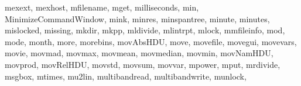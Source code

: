{{%
        mexext,%
        mexhost,%
        mfilename,%
        mget,%
        milliseconds,%
        min,%
        MinimizeCommandWindow,%
        mink,%
        minres,%
        minspantree,%
        minute,%
        minutes,%
        mislocked,%
        missing,%
        mkdir,%
        mkpp,%
        mldivide,%
        mlintrpt,%
        mlock,%
        mmfileinfo,%
        mod,%
        mode,%
        month,%
        more,%
        morebins,%
        movAbsHDU,%
        move,%
        movefile,%
        movegui,%
        movevars,%
        movie,%
        movmad,%
        movmax,%
        movmean,%
        movmedian,%
        movmin,%
        movNamHDU,%
        movprod,%
        movRelHDU,%
        movstd,%
        movsum,%
        movvar,%
        mpower,%
        mput,%
        mrdivide,%
        msgbox,%
        mtimes,%
        mu2lin,%
        multibandread,%
        multibandwrite,%
        munlock,%
}}
